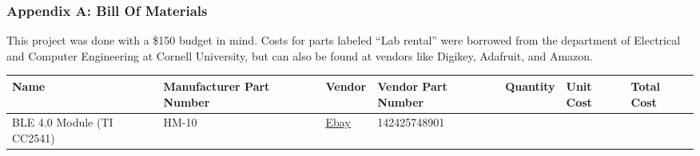 \documentclass[]{article}
\begin{document}
\subsubsection{Appendix A: Bill Of Materials}

This project was done with a \$150 budget in mind. Costs for parts labeled ``Lab rental'' were borrowed from the department of Electrical and Computer Engineering at Cornell University, but can also be found at vendors like Digikey, Adafruit, and Amazon.

\begin{longtable}[]{@{}lllllll@{}}
\toprule
\begin{minipage}[b]{0.15\columnwidth}\raggedright
Name\strut
\end{minipage} & \begin{minipage}[b]{0.15\columnwidth}\raggedright
Manufacturer Part Number\strut
\end{minipage} & \begin{minipage}[b]{0.10\columnwidth}\raggedright
Vendor\strut
\end{minipage} & \begin{minipage}[b]{0.17\columnwidth}\raggedright
Vendor Part Number\strut
\end{minipage} & \begin{minipage}[b]{0.11\columnwidth}\raggedright
Quantity\strut
\end{minipage} & \begin{minipage}[b]{0.06\columnwidth}\raggedright
Unit Cost\strut
\end{minipage} & \begin{minipage}[b]{0.07\columnwidth}\raggedright
Total Cost\strut
\end{minipage}\tabularnewline
\midrule
\endhead
\begin{minipage}[t]{0.15\columnwidth}\raggedright
BLE 4.0 Module (TI CC2541)\strut
\end{minipage} & \begin{minipage}[t]{0.15\columnwidth}\raggedright
HM-10\strut
\end{minipage} & \begin{minipage}[t]{0.10\columnwidth}\raggedright
\href{https://www.ebay.com/itm/AT-09-BLE-Bluetooth-4-0-Uart-Transceiver-Module-CC2541-Central-Switching-HM-10/142425748901?ssPageName=STRK\%3AMEBIDX\%3AIT\&_trksid=p2057872.m2749.l2649}{Ebay}\strut
\end{minipage} & \begin{minipage}[t]{0.17\columnwidth}\raggedright
142425748901\strut

\end{minipage}
\end{longtable}
\end{document}
